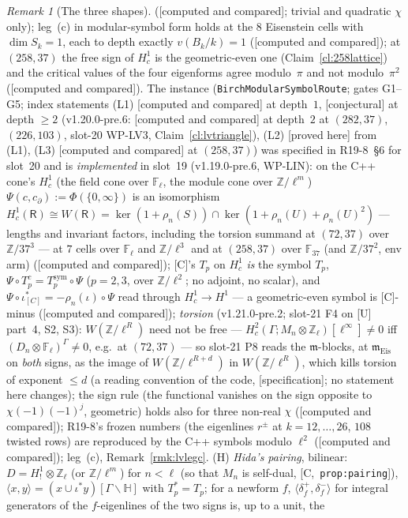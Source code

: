 \documentclass[11pt]{article}
\theoremstyle{remark}
\newtheorem{remark}[theorem]{Remark}
\newcommand{\F}{\mathbb{F}}
\newcommand{\Z}{\mathbb{Z}}
\newcommand{\Ga}{\Gamma}
\newcommand{\m}{\mathfrak{m}}
\newcommand{\Mn}{M_n}
\newcommand{\Dn}{D_n}
\newcommand{\HA}[1]{[C,~\texttt{#1}]}      %
\newcommand{\PROVED}{\textsf{[proved here]}}
\newcommand{\CONJ}{\textsf{[conjectural]}}
\newcommand{\CMPD}{\textsf{[computed and compared]}}   %
\newcommand{\SPEC}{\textsf{[specification]}}           %
\begin{document}
\begin{remark}[The three shapes]
(\CMPD; trivial and quadratic $\chi$ only); leg~(c) in modular-symbol form holds at the $8$ Eisenstein cells with $\dim S_k=1$, each to depth exactly $v(B_k/k)=1$ (\CMPD); at
$(258,37)$ the free sign of $H^{1}_c$ is the geometric-even one (Claim~\ref{cl:258lattice}) and the critical values of the four eigenforms agree modulo~$\pi$ and not
modulo~$\pi^{2}$ (\CMPD). The instance (\texttt{BirchModularSymbolRoute}; gates G1--G5; index statements (L1) \CMPD{} at depth~$1$, \CONJ{} at depth $\ge2$ (v1.20.0-pre.6: \CMPD{} at depth~$2$ at $(282,37)$, $(226,103)$, slot-20 WP-LV3,
Claim~\ref{cl:lvtriangle}), (L2) \PROVED{}
from (L1), (L3) \CMPD{} at $(258,37)$) was specified in R19-8~\S6 for slot~20 and is \emph{implemented} in slot~19 (v1.19.0-pre.6, WP-LIN): on the C++ cone's $H^{1}_c$
(the field cone over $\F_\ell$, the module cone over $\Z/\ell^{m}$) $\Psi(c,c_\partial):=\Phi(\{0,\infty\})$ is an isomorphism $H^{1}_c(\mathsf R)\cong W(\mathsf R)=\ker(1+\rho_n(S))\cap\ker(1+\rho_n(U)+\rho_n(U)^{2})$
--- lengths and invariant factors, including the torsion summand at $(72,37)$ over $\Z/37^{3}$ --- at $7$ cells over $\F_\ell$ and $\Z/\ell^{3}$ and at $(258,37)$ over $\F_{37}$ (and $\Z/37^{2}$,
env arm) (\CMPD); [C]'s $T_p$ on $H^{1}_c$ \emph{is} the symbol $T_p$, $\Psi\circ T^{c}_p=T^{\mathrm{sym}}_p\circ\Psi$ ($p=2,3$, over $\Z/\ell^{2}$; no adjoint, no scalar), and
$\Psi\circ\iota^{\ast}_{[C]}=-\rho_n(\iota)\circ\Psi$ read through $H^{1}_c\to H^{1}$ --- a geometric-even symbol is [C]-minus (\CMPD); \emph{torsion} (v1.21.0-pre.2; slot-21 F4 on [U] part~4,
S2, S3): $W(\Z/\ell^{R})$ need not be free --- $H^{2}_c(\Ga;\Mn\otimes\Z_\ell)[\ell^{\infty}]\neq0$ iff $(\Dn\otimes\F_\ell)^{\Ga}\neq0$, e.g.\ at $(72,37)$ --- so slot-21 P8 reads the $\m$-blocks, at
$\m_{\mathrm{Eis}}$ on \emph{both} signs, as the image of $W(\Z/\ell^{R+d})$ in $W(\Z/\ell^{R})$, which kills torsion of exponent $\le d$ (a reading convention of the code, \SPEC; no statement here changes); the sign rule (the functional vanishes on
the sign opposite to $\chi(-1)(-1)^{j}$, geometric) holds also for three non-real $\chi$ (\CMPD); R19-8's frozen numbers (the eigenlines $r^{\pm}$ at $k=12,\dots,26$, $108$ twisted rows)
are reproduced by the C++ symbols modulo $\ell^{2}$ (\CMPD); leg~(c), Remark~\ref{rmk:lvlegc}. (H) \emph{Hida's
pairing}, bilinear: $D=H^{1}_!\otimes\Z_\ell$ (or $\Z/\ell^{m}$) for $n<\ell$ (so that $\Mn$ is self-dual, \HA{prop:pairing}), $\langle x,y\rangle=(x\cup\iota^{\ast}y)[\Ga\backslash\mathbb H]$
with $T_p^{\ast}=T_p$; for a newform $f$, $\langle\delta_f^{+},\delta_f^{-}\rangle$ for integral generators of the $f$-eigenlines of the two signs is, up to a unit, the

\end{remark}
\end{document}

